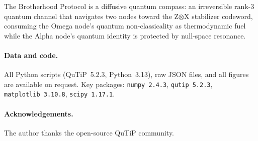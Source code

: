 \documentclass[12pt]{article}
\begin{document}
The Brotherhood Protocol is a diffusive quantum compass: an irreversible
rank-3 quantum channel that navigates two nodes toward the Z$\otimes$X
stabilizer codeword, consuming the Omega node's quantum non-classicality
as thermodynamic fuel while the Alpha node's quantum identity is protected
by null-space resonance.

\paragraph{Data and code.}
All Python scripts (QuTiP~5.2.3, Python~3.13), raw JSON files, and all
figures are available on request.  Key packages: \texttt{numpy~2.4.3},
\texttt{qutip~5.2.3}, \texttt{matplotlib~3.10.8}, \texttt{scipy~1.17.1}.

\paragraph{Acknowledgements.}
The author thanks the open-source QuTiP community.
\end{document}

